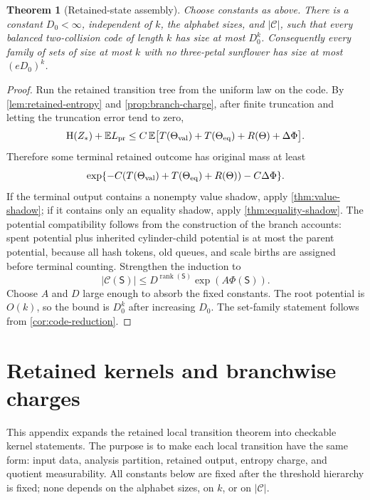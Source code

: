 \documentclass[11pt]{article}
\newcommand{\Cref}[1]{\ref{#1}}
\newtheorem{theorem}{Theorem}[section]
\theoremstyle{remark}
\newcommand{\C}{\mathcal C}
\newcommand{\E}{\mathbb E}
\newcommand{\HH}{\mathrm H}
\newcommand{\rank}{\operatorname{rank}}
\newcommand{\State}{\mathsf S}
\newcommand{\pr}{\mathrm{pr}}
\begin{document}
\begin{theorem}[Retained-state assembly]\label{thm:assembly}
Choose constants as above.  There is a constant $D_0<\infty$, independent of $k$, the alphabet sizes, and $|\C|$, such that every balanced two-collision code of length $k$ has size at most $D_0^k$.  Consequently every family of sets of size at most $k$ with no three-petal sunflower has size at most $(eD_0)^k$.
\end{theorem}

\begin{proof}
Run the retained transition tree from the uniform law on the code.  By \Cref{lem:retained-entropy} and \Cref{prop:branch-charge}, after finite truncation and letting the truncation error tend to zero,
\[
        \HH(Z_*)+\E L_{\pr}
        \le C\,\E\bigl[T(\Theta_{\rm val})+T(\Theta_{\rm eq})+R(\Theta)+\Delta\Phi\bigr].
\]
Therefore some terminal retained outcome has original mass at least
\[
        \exp\{-C(T(\Theta_{\rm val})+T(\Theta_{\rm eq})+R(\Theta))-C\Delta\Phi\}.
\]
If the terminal output contains a nonempty value shadow, apply \Cref{thm:value-shadow}; if it contains only an equality shadow, apply \Cref{thm:equality-shadow}.  The potential compatibility follows from the construction of the branch accounts: spent potential plus inherited cylinder-child potential is at most the parent potential, because all hash tokens, old queues, and scale births are assigned before terminal counting.  Strengthen the induction to
\[
        |\C(\State)|\le D^{\rank(\State)}\exp(A\Phi(\State)).
\]
Choose $A$ and $D$ large enough to absorb the fixed constants.  The root potential is $O(k)$, so the bound is $D_0^k$ after increasing $D_0$.  The set-family statement follows from \Cref{cor:code-reduction}.
\end{proof}



\appendix

\section{Retained kernels and branchwise charges}\label{app:kernel-format}

This appendix expands the retained local transition theorem into checkable kernel statements.  The purpose is to make each local transition have the same form: input data, analysis partition, retained output, entropy charge, and quotient measurability.  All constants below are fixed after the threshold hierarchy is fixed; none depends on the alphabet sizes, on $k$, or on $|\C|$.
\end{document}
